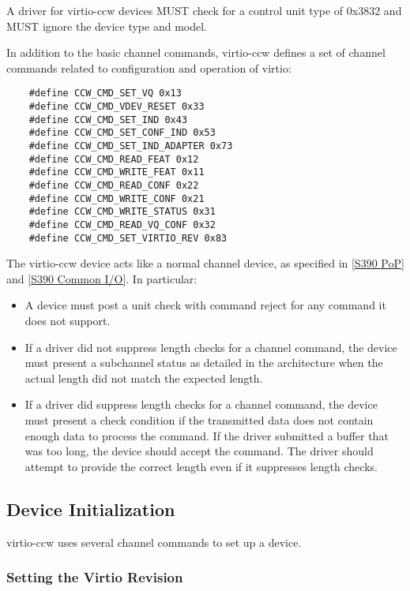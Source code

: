 A driver for virtio-ccw devices MUST check for a control unit
type of 0x3832 and MUST ignore the device type and model.

In addition to the basic channel commands, virtio-ccw defines a
set of channel commands related to configuration and operation of
virtio:

\begin{lstlisting}
	#define CCW_CMD_SET_VQ 0x13
	#define CCW_CMD_VDEV_RESET 0x33
	#define CCW_CMD_SET_IND 0x43
	#define CCW_CMD_SET_CONF_IND 0x53
	#define CCW_CMD_SET_IND_ADAPTER 0x73
	#define CCW_CMD_READ_FEAT 0x12
	#define CCW_CMD_WRITE_FEAT 0x11
	#define CCW_CMD_READ_CONF 0x22
	#define CCW_CMD_WRITE_CONF 0x21
	#define CCW_CMD_WRITE_STATUS 0x31
	#define CCW_CMD_READ_VQ_CONF 0x32
	#define CCW_CMD_SET_VIRTIO_REV 0x83
\end{lstlisting}

The virtio-ccw device acts like a normal channel device, as specified
in \hyperref[intro:S390 PoP]{[S390 PoP]} and \hyperref[intro:S390 Common I/O]{[S390 Common I/O]}. In particular:

\begin{itemize}
\item A device must post a unit check with command reject for any command
  it does not support.

\item If a driver did not suppress length checks for a channel command,
  the device must present a subchannel status as detailed in the
  architecture when the actual length did not match the expected length.

\item If a driver did suppress length checks for a channel command, the
  device must present a check condition if the transmitted data does
  not contain enough data to process the command. If the driver submitted
  a buffer that was too long, the device should accept the command.
  The driver should attempt to provide the correct length even if it
  suppresses length checks.
\end{itemize}

\subsection{Device Initialization}\label{sec:Virtio Transport Options / Virtio over channel I/O / Device Initialization}

virtio-ccw uses several channel commands to set up a device.

\subsubsection{Setting the Virtio Revision}\label{sec:Virtio Transport Options / Virtio over channel I/O / Device Initialization / Setting the Virtio Revision}

